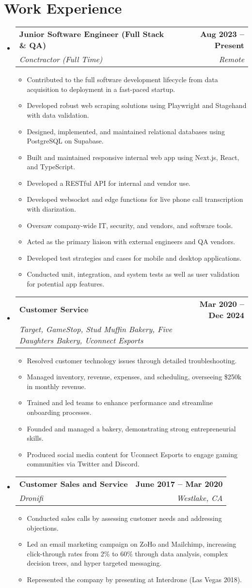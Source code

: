 \documentclass[letterpaper,11pt]{article}
\makeatletter
\newcommand{\resumeItem}[1]{
  \item\small{
    {#1 \vspace{-2pt}}
  }
}
\newcommand{\resumeSubheading}[4]{
  \vspace{-2pt}\item
    \begin{tabular*}{1.0\textwidth}[t]{l@{\extracolsep{\fill}}r}
      \textbf{#1} & \textbf{\small #2} \\
      \textit{\small #3} & \textit{\small #4} \\
    \end{tabular*}\vspace{-7pt}
}
\newcommand{\resumeSubHeadingListStart}{\begin{itemize}[leftmargin=0in, label={}]}
\newcommand{\resumeSubHeadingListEnd}{\end{itemize}}
\newcommand{\resumeItemListStart}{\begin{itemize}}
\newcommand{\resumeItemListEnd}{\end{itemize}\vspace{-5pt}}
\makeatother
\begin{document}
\section{Work Experience}
\resumeSubHeadingListStart
    \resumeSubheading
      {Junior Software Engineer (Full Stack \& QA)}{Aug 2023 -- Present}
      {Conctractor (Full Time)}{Remote}
      \resumeItemListStart
          \resumeItem{Contributed to the full software development lifecycle from data acquisition to deployment in a fast-paced startup.}
          \resumeItem{Developed robust web scraping solutions using Playwright and Stagehand with data validation.}
          \resumeItem{Designed, implemented, and maintained relational databases using PostgreSQL on Supabase.}
          \resumeItem{Built and maintained responsive internal web app using Next.js, React, and TypeScript.}
          \resumeItem{Developed a RESTful API for internal and vendor use.}
          \resumeItem{Developed websocket and edge functions for live phone call transcription with diarization.}
          \resumeItem{Oversaw company-wide IT, security, and vendors, and software tools.}
          \resumeItem{Acted as the primary liaison with external engineers and QA vendors.}
          \resumeItem{Developed test strategies and cases for mobile and desktop applications.}
          \resumeItem{Conducted unit, integration, and system tests as well as user validation for potential app features.}
      \resumeItemListEnd
    \resumeSubheading
      {Customer Service}{Mar 2020 -- Dec 2024}
      {Target, GameStop, Stud Muffin Bakery, Five Daughters Bakery, Uconnect Esports}{}
      \resumeItemListStart
          \resumeItem{Resolved customer technology issues through detailed troubleshooting.}
          \resumeItem{Managed inventory, revenue, expenses, and scheduling, overseeing \$250k in monthly revenue.}
          \resumeItem{Trained and led teams to enhance performance and streamline onboarding processes.}
          \resumeItem{Founded and managed a bakery, demonstrating strong entrepreneurial skills.}
          \resumeItem{Produced social media content for Uconnect Esports to engage gaming communities via Twitter and Discord.}
      \resumeItemListEnd%
    \resumeSubheading
      {Customer Sales and Service}{June 2017 -- Mar 2020}
      {Dronifi}{Westlake, CA}
      \resumeItemListStart
          \resumeItem{Conducted sales calls by assessing customer needs and addressing objections.}
          \resumeItem{Led an email marketing campaign on ZoHo and Mailchimp, increasing click-through rates from 2\% to 60\% through data analysis, complex decision trees, and hyper targeted messaging.}
          \resumeItem{Represented the company by presenting at Interdrone (Las Vegas 2018).}
      \resumeItemListEnd
\resumeSubHeadingListEnd
\end{document}
